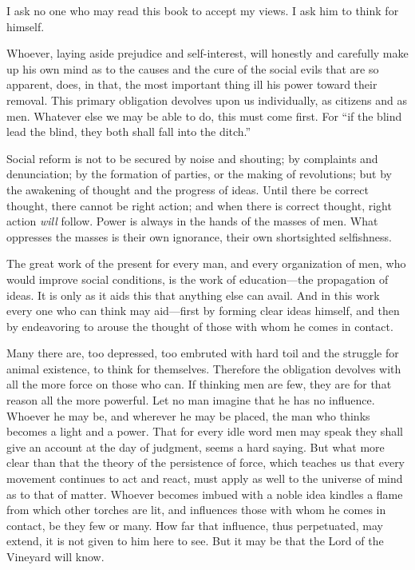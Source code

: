 \documentclass{book}
\begin{document}
I ask no one who may read this book to accept my views. I ask him to think for himself.

Whoever, laying aside prejudice and self-interest, will honestly and carefully make up his own mind as to the causes and the cure of the social evils that are so apparent, does, in that, the most important thing ill his power toward their removal. This primary obligation devolves upon us individually, as citizens and as men. Whatever else we may be able to do, this must come first. For “if the blind lead the blind, they both shall fall into the ditch.”

Social reform is not to be secured by noise and shouting; by complaints and denunciation; by the formation of parties, or the making of revolutions; but by the awakening of thought and the progress of ideas. Until there be correct thought, there cannot be right action; and when there is correct thought, right action \emph{will} follow. Power is always in the hands of the masses of men. What oppresses the masses is their own ignorance, their own shortsighted selfishness.

The great work of the present for every man, and every organization of men, who would improve social conditions, is the work of education—the propagation of ideas. It is only as it aids this that anything else can avail. And in this work every one who can think may aid—first by forming clear ideas himself, and then by endeavoring to arouse the thought of those with whom he comes in contact.

Many there are, too depressed, too embruted with hard toil and the struggle for animal existence, to think for themselves. Therefore the obligation devolves with all the more force on those who can. If thinking men are few, they are for that reason all the more powerful. Let no man imagine that he has no influence. Whoever he may be, and wherever he may be placed, the man who thinks becomes a light and a power. That for every idle word men may speak they shall give an account at the day of judgment, seems a hard saying. But what more clear than that the theory of the persistence of force, which teaches us that every movement continues to act and react, must apply as well to the universe of mind as to that of matter. Whoever becomes imbued with a noble idea kindles a flame from which other torches are lit, and influences those with whom he comes in contact, be they few or many. How far that influence, thus perpetuated, may extend, it is not given to him here to see. But it may be that the Lord of the Vineyard will know.
\end{document}
